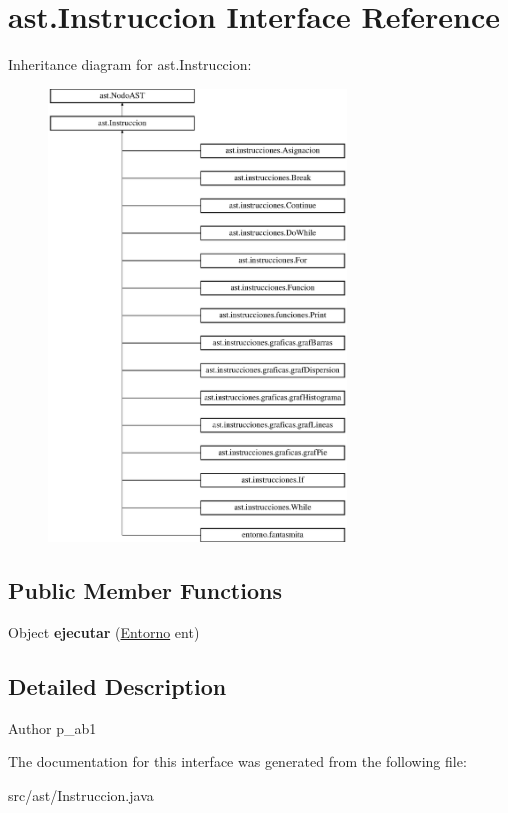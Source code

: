 \hypertarget{interfaceast_1_1_instruccion}{}\section{ast.\+Instruccion Interface Reference}
\label{interfaceast_1_1_instruccion}
Inheritance diagram for ast.\+Instruccion\+:\begin{figure}[H]
\begin{center}
\leavevmode
\includegraphics[height=12.000000cm]{interfaceast_1_1_instruccion}
\end{center}
\end{figure}
\subsection*{Public Member Functions}
\begin{DoxyCompactItemize}
\item 
\mbox{\label{interfaceast_1_1_instruccion_a2c794ecf93e49743324d82b3ddb1fe89}} 
Object {\bfseries ejecutar} (\mbox{\hyperlink{classentorno_1_1_entorno}{Entorno}} ent)
\end{DoxyCompactItemize}


\subsection{Detailed Description}
\begin{DoxyAuthor}{Author}
p\+\_\+ab1 
\end{DoxyAuthor}


The documentation for this interface was generated from the following file\+:\begin{DoxyCompactItemize}
\item 
src/ast/Instruccion.\+java\end{DoxyCompactItemize}
